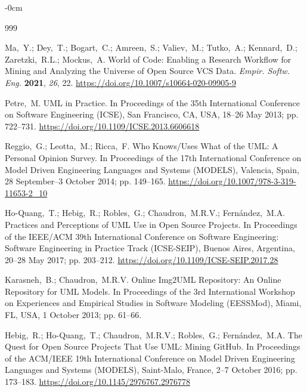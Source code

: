 \documentclass[data,datadescriptor,submit,pdftex,moreauthors]{Definitions/mdpi}
\begin{document}
\begin{adjustwidth}{-\extralength}{0cm}


% 

\begin{thebibliography}{999}

Ma,~Y.; Dey,~T.; Bogart,~C.; Amreen,~S.; Valiev,~M.; Tutko,~A.; Kennard,~D.; Zaretzki,~R.L.; Mockus,~A. World of Code: Enabling a Research Workflow for Mining and Analyzing the Universe of Open Source VCS Data. {\em Empir. Softw. Eng.} {\bf 2021}, {\em 26}, 22. \url{https://doi.org/10.1007/s10664-020-09905-9}

Petre,~M. UML in Practice. In Proceedings of the 35th International Conference on Software Engineering (ICSE), San Francisco, CA, USA, 18--26 May 2013; pp. 722--731. \url{https://doi.org/10.1109/ICSE.2013.6606618}

Reggio,~G.; Leotta,~M.; Ricca,~F. Who Knows/Uses What of the UML: A Personal Opinion Survey. In Proceedings of the 17th International Conference on Model Driven Engineering Languages and Systems (MODELS), Valencia, Spain, 28 September--3 October 2014; pp. 149--165. \url{https://doi.org/10.1007/978-3-319-11653-2_10}

Ho-Quang,~T.; Hebig,~R.; Robles,~G.; Chaudron,~M.R.V.; Fern\'{a}ndez,~M.A. Practices and Perceptions of UML Use in Open Source Projects. In Proceedings of the IEEE/ACM 39th International Conference on Software Engineering: Software Engineering in Practice Track (ICSE-SEIP), Buenos Aires, Argentina, 20--28 May 2017; pp. 203--212. \url{https://doi.org/10.1109/ICSE-SEIP.2017.28}

Karasneh,~B.; Chaudron,~M.R.V. Online Img2UML Repository: An Online Repository for UML Models. In Proceedings of the 3rd International Workshop on Experiences and Empirical Studies in Software Modeling (EESSMod), Miami, FL, USA, 1 October 2013; pp. 61--66.

Hebig,~R.; Ho-Quang,~T.; Chaudron,~M.R.V.; Robles,~G.; Fern\'{a}ndez,~M.A. The Quest for Open Source Projects That Use UML: Mining GitHub. In Proceedings of the ACM/IEEE 19th International Conference on Model Driven Engineering Languages and Systems (MODELS), Saint-Malo, France, 2--7 October 2016; pp. 173--183. \url{https://doi.org/10.1145/2976767.2976778}


\end{thebibliography}
\end{adjustwidth}
\end{document}

